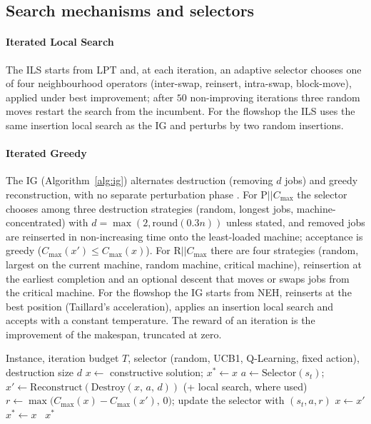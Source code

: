 \subsection{Search mechanisms and selectors}
\label{sec:method}

\paragraph{Iterated Local Search}
\label{sec:ils}
The ILS starts from LPT and, at each iteration, an adaptive selector chooses one of four neighbourhood operators (inter-swap, reinsert, intra-swap, block-move), applied under best improvement; after
$50$ non-improving iterations three random moves restart the search from the incumbent. For the flowshop the ILS uses the same insertion local search as the IG and perturbs by two random insertions.

\paragraph{Iterated Greedy}
\label{sec:ig}
The IG (Algorithm~\ref{alg:ig}) alternates destruction (removing $d$ jobs) and greedy reconstruction, with no separate perturbation phase \citep{RuizStutzle2007}. For P$||C_{\max}$ the selector
chooses among three destruction strategies (random, longest jobs, machine-concentrated) with $d=\max(2,\mathrm{round}(0.3n))$ unless stated, and removed jobs are reinserted in non-increasing
time onto the least-loaded machine; acceptance is greedy ($C_{\max}(x')\leq C_{\max}(x)$). For R$||C_{\max}$ there are four strategies (random, largest on the current machine, random machine,
critical machine), reinsertion at the earliest completion and an optional descent that moves or swaps jobs from the critical machine. For the flowshop the IG starts from NEH, reinserts at the best
position (Taillard's acceleration), applies an insertion local search and accepts with a constant temperature. The reward of an iteration is the improvement of the makespan, truncated at zero.

\begin{algorithm}[tb]
\caption{IG with an adaptive selector}
\label{alg:ig}
\begin{algorithmic}[1]
\REQUIRE Instance, iteration budget $T$, selector (random, UCB1, Q-Learning, fixed action), destruction size $d$
\STATE $x \leftarrow$ constructive solution; $x^{*} \leftarrow x$
\STATE $a \leftarrow \mathrm{Selector}(s_t)$; \quad $x' \leftarrow \mathrm{Reconstruct}(\mathrm{Destroy}(x,\, a,\, d))$ \hfill (+ local search, where used)
\STATE $r \leftarrow \max\bigl(C_{\max}(x) - C_{\max}(x'),\, 0\bigr)$; \quad update the selector with $(s_t, a, r)$
\STATE $x \leftarrow x'$\ENDIF
{}\STATE $x^{*} \leftarrow x$\ENDIF
\ENDFOR
\RETURN~$x^{*}$
\end{algorithmic}
\end{algorithm}


